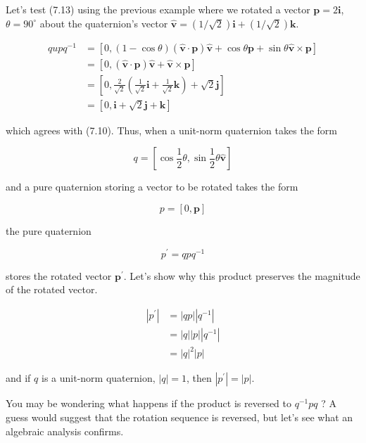 Let's test (7.13) using the previous example where we rotated a vector $\mathbf{p}=2 \mathbf{i}$, $\theta=90^{\circ}$ about the quaternion's vector $\hat{\mathbf{v}}=(1 / \sqrt{2}) \mathbf{i}+(1 / \sqrt{2}) \mathbf{k}$.

$$
\begin{aligned}
q u p q^{-1} & =[0,(1-\cos \theta)(\hat{\mathbf{v}} \cdot \mathbf{p}) \hat{\mathbf{v}}+\cos \theta \mathbf{p}+\sin \theta \hat{\mathbf{v}} \times \mathbf{p}] \\
& =[0,(\hat{\mathbf{v}} \cdot \mathbf{p}) \hat{\mathbf{v}}+\hat{\mathbf{v}} \times \mathbf{p}] \\
& =\left[0, \frac{2}{\sqrt{2}}\left(\frac{1}{\sqrt{2}} \mathbf{i}+\frac{1}{\sqrt{2}} \mathbf{k}\right)+\sqrt{2} \mathbf{j}\right] \\
& =[0, \mathbf{i}+\sqrt{2} \mathbf{j}+\mathbf{k}]
\end{aligned}
$$

which agrees with (7.10). Thus, when a unit-norm quaternion takes the form

$$
q=\left[\cos \frac{1}{2} \theta, \sin \frac{1}{2} \theta \hat{\mathbf{v}}\right]
$$

and a pure quaternion storing a vector to be rotated takes the form

$$
p=[0, \mathbf{p}]
$$

the pure quaternion

$$
p^{\prime}=q p q^{-1}
$$

stores the rotated vector $\mathbf{p}^{\prime}$. Let's show why this product preserves the magnitude of the rotated vector.

$$
\begin{aligned}
\left|p^{\prime}\right| & =|q p|\left|q^{-1}\right| \\
& =|q||p|\left|q^{-1}\right| \\
& =|q|^{2}|p|
\end{aligned}
$$

and if $q$ is a unit-norm quaternion, $|q|=1$, then $\left|p^{\prime}\right|=|p|$.

You may be wondering what happens if the product is reversed to $q^{-1} p q$ ? A guess would suggest that the rotation sequence is reversed, but let's see what an algebraic analysis confirms.

